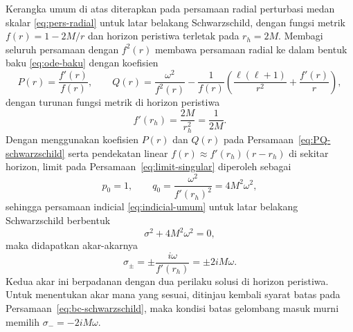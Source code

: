 \noindent Kerangka umum di atas diterapkan pada persamaan radial perturbasi medan skalar
\eqref{eq:pers-radial} untuk latar belakang Schwarzschild, dengan fungsi metrik
$f(r) = 1 - 2M/r$ dan horizon peristiwa terletak pada $r_h = 2M$. Membagi seluruh persamaan
dengan $f^2(r)$ membawa persamaan radial ke dalam bentuk baku \eqref{eq:ode-baku} dengan
koefisien
\begin{equation}
    P(r) = \frac{f'(r)}{f(r)}, \qquad
    Q(r) = \frac{\omega^2}{f^2(r)} - \frac{1}{f(r)}\left(\frac{\ell(\ell+1)}{r^2} + \frac{f'(r)}{r}\right),
    \label{eq:PQ-schwarzschild}
\end{equation}
dengan turunan fungsi metrik di horizon peristiwa
\begin{equation}
    f'(r_h) = \frac{2M}{r_h^2} = \frac{1}{2M}.
\end{equation}
Dengan menggunakan koefisien $P(r)$ dan $Q(r)$ pada Persamaan~\eqref{eq:PQ-schwarzschild}
serta pendekatan linear $f(r) \approx f'(r_h)(r-r_h)$ di sekitar horizon, limit pada
Persamaan~\eqref{eq:limit-singular} diperoleh sebagai
\begin{equation}
    p_0 = 1, \qquad q_0 = \frac{\omega^2}{f'(r_h)^2} = 4M^2\omega^2,
\end{equation}
sehingga persamaan indicial \eqref{eq:indicial-umum} untuk latar belakang Schwarzschild
berbentuk
\begin{equation}
    \sigma^2 + 4M^2\omega^2 = 0,
    \label{eq:indicial_horizon_saf}
\end{equation}
maka didapatkan akar-akarnya
\begin{equation}
    \sigma_{\pm} = \pm\frac{i\omega}{f'(r_h)} = \pm 2iM\omega.
    \label{eq:eksponen_horizon_saf}
\end{equation}
Kedua akar ini berpadanan dengan dua perilaku solusi di horizon peristiwa. Untuk menentukan
akar mana yang sesuai, ditinjau kembali syarat batas pada
Persamaan~\eqref{eq:bc-schwarzschild}, maka kondisi batas gelombang masuk murni memilih
$\sigma_- = -2iM\omega$.

